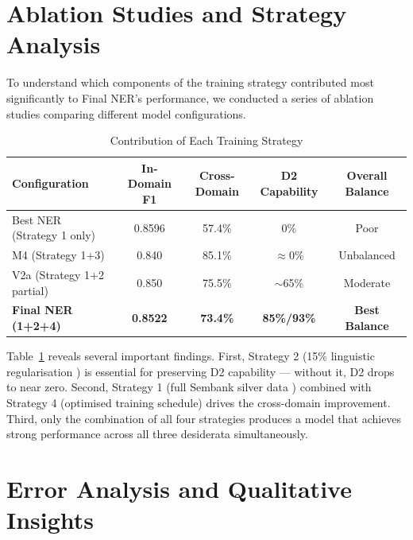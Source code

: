 \section{Ablation Studies and Strategy Analysis}

To understand which components of the training strategy contributed most significantly to Final NER's performance, we conducted a series of ablation studies comparing different model configurations.

\begin{table}[H]
\centering
\caption{Contribution of Each Training Strategy}
\label{tab:ablation}
\small
\begin{tabular}{@{}lcccc@{}}
\toprule
\textbf{Configuration} & \textbf{In-Domain F1} & \textbf{Cross-Domain} & \textbf{D2 Capability} & \textbf{Overall Balance} \\
\midrule
Best NER (Strategy 1 only) & 0.8596 & 57.4\% & 0\% & Poor \\
M4 (Strategy 1+3) & 0.840 & 85.1\% & $\approx$0\% & Unbalanced \\
V2a (Strategy 1+2 partial) & 0.850 & 75.5\% & $\sim$65\% & Moderate \\
\textbf{Final NER (1+2+4)} & \textbf{0.8522} & \textbf{73.4\%} & \textbf{85\%/93\%} & \textbf{Best Balance} \\
\bottomrule
\end{tabular}
\end{table}

Table~\ref{tab:ablation} reveals several important findings. First, Strategy 2 (15\% linguistic regularisation \cite{caruana1997multitask, ruder2017overview}) is essential for preserving D2 capability --- without it, D2 drops to near zero. Second, Strategy 1 (full Sembank silver data \cite{hellwig2010dcs}) combined with Strategy 4 (optimised training schedule) drives the cross-domain improvement. Third, only the combination of all four strategies produces a model that achieves strong performance across all three desiderata simultaneously.

\section{Error Analysis and Qualitative Insights}

